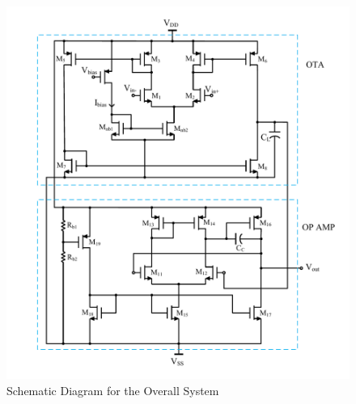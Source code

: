 \begin{figure} [H]
\centering
\includegraphics[scale=1]{Figures/Schematics/OTA_OPAMP_Schematic.pdf}
\caption{Schematic Diagram for the Overall System}
\end{figure}
